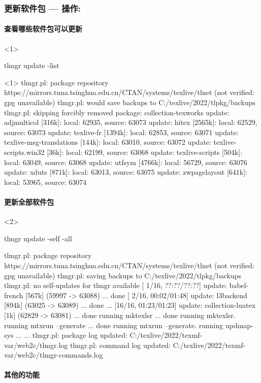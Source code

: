 \begin{frame}[fragile,t]
  \frametitle{更新软件包 --- 操作: }
  \framesubtitle<1>{查看哪些软件包可以更新}
  \begin{onlyenv}<1>
\begin{cmdcode}
tlmgr update -list
\end{cmdcode}
\begin{outputcode}<1>
tlmgr.pl: package repository https://mirrors.tuna.tsinghua.edu.cn/CTAN/systems/texlive/tlnet (not verified: gpg unavailable)
tlmgr.pl: would save backups to C:/texlive/2022/tlpkg/backups
tlmgr.pl: skipping forcibly removed package: collection-texworks
update:   adjmulticol   [316k]: local:  62935, source:  63073
update:   hitex         [2565k]: local:  62529, source:  63073
update:   texlive-fr    [1394k]: local:  62853, source:  63071
update:   texlive-msg-translations [144k]: local:  63010, source:  63072
update:   texlive-scripts.win32 [36k]: local:  62199, source:  63068
update:   texlive-scripts [504k]: local:  63049, source:  63068
update:   utfsym         [4766k]: local:  56729, source:  63076
update:   xduts          [871k]: local:  63013, source:  63075
update:   zwpagelayout   [641k]: local:  53965, source:  63074  
\end{outputcode}
  \end{onlyenv}
  \framesubtitle<2>{更新全部软件包}
  \begin{onlyenv}<2>
\begin{cmdcode}
tlmgr update -self -all
\end{cmdcode}
\begin{outputcode}
tlmgr.pl: package repository https://mirrors.tuna.tsinghua.edu.cn/CTAN/systems/texlive/tlnet (not verified: gpg unavailable)
tlmgr.pl: saving backups to C:/texlive/2022/tlpkg/backups
tlmgr.pl: no self-updates for tlmgr available
[ 1/16, ??:??/??:??] update: babel-french [567k] (59997 -> 63088) ... done
[ 2/16, 00:02/01:48] update: l3backend [894k] (63025 -> 63089) ... done
...
[16/16, 01:23/01:23] update: collection-luatex [1k] (62829 -> 63081) ... done
running mktexlsr ...
done running mktexlsr.
running mtxrun --generate ...
done running mtxrun --generate.
running updmap-sys ...
...
tlmgr.pl: package log updated: C:/texlive/2022/texmf-var/web2c/tlmgr.log
tlmgr.pl: command log updated: C:/texlive/2022/texmf-var/web2c/tlmgr-commands.log
\end{outputcode}
  \end{onlyenv}
  \framesubtitle<3>{其他的功能}
  \begin{enumerate}[<3->]

\end{enumerate}
\end{frame}
